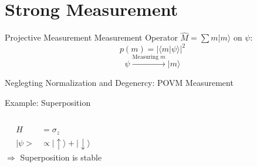 \documentclass[
]{beamer}
\begin{document}
\section{Strong Measurement}
\begin{frame}{Projective Measurement}
	Measurement Operator $\hat M = \sum m |m\rangle$ on $\psi$:
	$$p(m) = |\langle m|\psi\rangle|^2$$
	$$\psi \xrightarrow{\text{Measuring }m} |m\rangle$$

	{\small\textcolor{seegrau}{
		Neglegting Normalization and Degenercy:
		POVM Measurement
	}}

\end{frame}

\begin{frame}{Example: Superposition}
	\begin{columns}
		\begin{align*}
			H &= \sigma_z\\
			|\psi> &\propto |\uparrow\rangle + |\downarrow\rangle
		\end{align*}
		$\Rightarrow$ Superposition is stable




\end{columns}
\end{frame}
\end{document}
